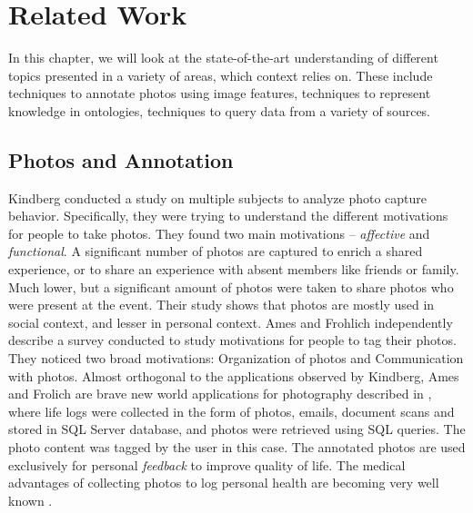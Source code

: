 \chapter{Related Work}

In this chapter, we will look at the state-of-the-art understanding of different topics presented in a variety of areas, which context relies on. These include techniques to annotate photos using image features, techniques to represent knowledge in ontologies, techniques to query data from a variety of sources.

\section{Photos and Annotation}

Kindberg \cite{kindberg2005ubiquitous} conducted a study on multiple subjects to analyze photo capture behavior. Specifically, they were trying to understand the different motivations for people to take photos. They found two main motivations -- \textit{affective} and \textit{functional}. A significant number of photos are captured to enrich a shared experience, or to share an experience with absent members like friends or family. Much lower, but a significant amount of photos were taken to share photos who were present at the event. Their study shows that photos are mostly used in social context, and lesser in personal context. Ames \cite{ames2007we} and Frohlich \cite{frohlich2002requirements} independently describe a survey conducted to study motivations for people to tag their photos. They noticed two broad motivations: Organization of photos and Communication with photos. Almost orthogonal to the applications observed by Kindberg, Ames and Frolich are brave new world applications for photography described in \cite{gemmell2002mylifebits, dumais2003stuff}, where life logs were collected in the form of photos, emails, document scans and stored in SQL Server database, and photos were retrieved using SQL queries. The photo content was tagged by the user in this case. The annotated photos are used exclusively for personal \textit{feedback} to improve quality of life. The medical advantages of collecting photos to log personal health are becoming very well known \cite{bell2010total}.

